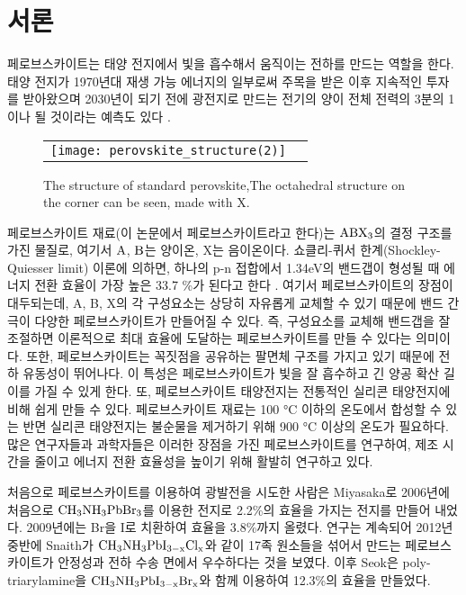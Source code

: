 
\section{서론}

페로브스카이트는 태양 전지에서 빛을 흡수해서 움직이는 전하를 만드는 역할을 한다. 태양 전지가 1970년대 재생 가능 에너지의 일부로써 주목을 받은 이후 지속적인 투자를 받아왔으며 2030년이 되기 전에 광전지로 만드는 전기의 양이 전체 전력의 3분의 1이나 될 것이라는 예측도 있다 \cite{turner2013global}.

\begin{figure}[h!]
	\begin{center}
		\begin{tabular}{cc}
			\texttt{[image: perovskite\_structure(2)]} 
		\end{tabular}
		\caption{The structure of standard perovskite,The octahedral structure on the corner can be seen, made with X. }	
		\label{fig:FIR101}
	\end{center}
\end{figure}

페로브스카이트 재료(이 논문에서 페로브스카이트라고 한다)는 $\rm{ABX_3}$의 결정 구조를 가진 물질로, 여기서 $\rm{A}$, $\rm{B}$는 양이온, X는 음이온이다. 쇼클리-퀴서 한계(Shockley-Quiesser limit) 이론에 의하면, 하나의 p-n 접합에서 1.34eV의 밴드갭이 형성될 때 에너지 전환 효율이 가장 높은 33.7 \%가 된다고 한다 \cite{ruhle2016tabulated}. 여기서 페로브스카이트의 장점이 대두되는데, A, B, X의 각 구성요소는 상당히 자유롭게 교체할 수 있기 때문에 밴드 간극이  다양한 페로브스카이트가 만들어질 수 있다. 즉, 구성요소를 교체해 밴드갭을 잘 조절하면 이론적으로 최대 효율에 도달하는 페로브스카이트를 만들 수 있다는 의미이다. 또한, 페로브스카이트는 꼭짓점을 공유하는 팔면체 구조를 가지고 있기 때문에 전하 유동성이 뛰어나다\cite{linaburg2015studies}. 이 특성은 페로브스카이트가 빛을 잘 흡수하고 긴 양공 확산 길이를 가질 수 있게 한다\cite{green2014emergence}. 또, 페로브스카이트 태양전지는 전통적인 실리콘 태양전지에 비해 쉽게 만들 수 있다. 페로브스카이트 재료는 100 °C 이하의 온도에서 합성할 수 있는 반면 실리콘 태양전지는 불순물을 제거하기 위해 900 °C 이상의 온도가 필요하다.
많은 연구자들과 과학자들은 이러한 장점을 가진 페로브스카이트를 연구하여, 제조 시간을 줄이고 에너지 전환 효율성을 높이기 위해 활발히 연구하고 있다.

처음으로 페로브스카이트를 이용하여 광발전을 시도한 사람은 Miyasaka로 2006년에 처음으로 $\rm{CH_3NH_3PbBr_3}$를 이용한 전지로 2.2\%의 효율을 가지는 전지를 만들어 내었다\cite{kojima2006novel}. 2009년에는 Br을 I로 치환하여 효율을 3.8\%까지 올렸다\cite{kojima2009organometal}. 연구는 계속되어 2012년 중반에 Snaith가  $\rm{CH_{3}NH_3PbI_{3-x}Cl_x}$와 같이 17족 원소들을 섞어서 만드는 페로브스카이트가 안정성과 전하 수송 면에서 우수하다는 것을 보였다\cite{lee2012efficient}. 이후 Seok은 poly-triarylamine을 $\rm{CH_{3}NH_3PbI_{3-x}Br_x}$와 함께 이용하여 12.3\%의 효율을 만들었다\cite{noh2013chemical}.

